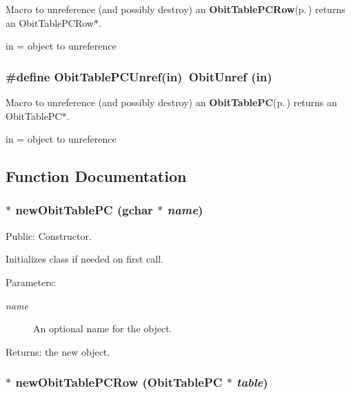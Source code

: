 Macro to unreference (and possibly destroy) an {\bf Obit\-Table\-PCRow}{\rm (p.\,\pageref{structObitTablePCRow})} returns an Obit\-Table\-PCRow$\ast$. 

in = object to unreference 
\subsubsection{\setlength{\rightskip}{0pt plus 5cm}\#define Obit\-Table\-PCUnref(in)\ Obit\-Unref (in)}\label{ObitTablePC_8h_a1}


Macro to unreference (and possibly destroy) an {\bf Obit\-Table\-PC}{\rm (p.\,\pageref{structObitTablePC})} returns an Obit\-Table\-PC$\ast$. 

in = object to unreference 

\subsection{Function Documentation}
\subsubsection{$\ast$ new\-Obit\-Table\-PC (gchar $\ast$ {\em name})}\label{ObitTablePC_8h_a11}


Public: Constructor. 

Initializes class if needed on first call. \begin{Desc}
\item[Parameters:]
\begin{description}
\item[{\em name}]An optional name for the object. \end{description}
\end{Desc}
\begin{Desc}
\item[Returns:]the new object. \end{Desc}
\subsubsection{$\ast$ new\-Obit\-Table\-PCRow ({\bf Obit\-Table\-PC} $\ast$ {\em table})}\label{ObitTablePC_8h_a8}


